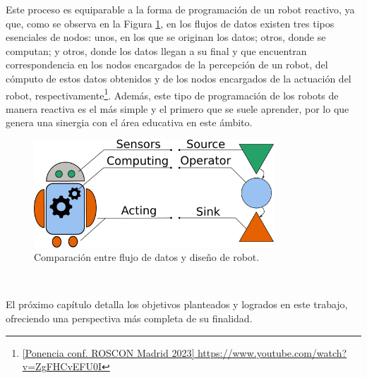 Este proceso es equiparable a la forma de programación de un robot reactivo, ya
que, como se observa en la Figura \ref{fig:data_flow_vs_robotics}, en los flujos
de datos existen tres tipos esenciales de nodos: unos, en los que se originan
los datos; otros, donde se computan; y otros, donde los datos llegan a su final
y que encuentran correspondencia en los nodos encargados de la percepción de un
robot, del cómputo de estos datos obtenidos y de los nodos encargados de la
actuación del robot, respectivamente\footnote{
\href{https://www.youtube.com/watch?v=ZgFHCvEFU0I}{[Ponencia conf. ROSCON Madrid
2023] https://www.youtube.com/watch?v=ZgFHCvEFU0I}}.
Además, este tipo de programación de los robots de manera reactiva es el más
simple y el primero que se suele aprender, por lo que genera una sinergia con el
área educativa en este ámbito.

\begin{figure} [h!]
  \begin{center}
    \includegraphics[width=9cm]{figs/data-flow_vs_robotics_scheme}
  \end{center}
  \caption{Comparación entre flujo de datos y diseño de robot.}
  \label{fig:data_flow_vs_robotics}
\end{figure}\



El próximo capítulo detalla los objetivos planteados y logrados en este trabajo,
ofreciendo una perspectiva más completa de su finalidad.
